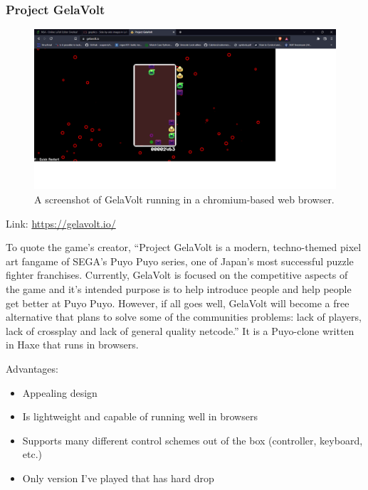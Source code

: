 \documentclass{report}
\begin{document}
\subsubsection{Project GelaVolt}

\begin{figure}[ht]
\centering
\includegraphics[width=1\textwidth]{gelavolt.png}
\caption{\label{fig:gelavolt}A screenshot of GelaVolt running in a chromium-based web browser.}
\end{figure}
Link: \href{https://gelavolt.io/}{https://gelavolt.io/}

To quote the game’s creator, “Project GelaVolt is a modern, techno-themed pixel art fangame of SEGA's Puyo Puyo series, one of Japan's most successful puzzle fighter franchises. Currently, GelaVolt is focused on the competitive aspects of the game and it's intended purpose is to help introduce people and help people get better at Puyo Puyo. However, if all goes well, GelaVolt will become a free alternative that plans to solve some of the communities problems: lack of players, lack of crossplay and lack of general quality netcode.” It is a Puyo-clone written in Haxe that runs in browsers.
\vspace{0.3cm}

Advantages:

\begin{itemize}
    \renewcommand\labelitemi{--}
    \item Appealing design
    \item Is lightweight and capable of running well in browsers
    \item Supports many different control schemes out of the box (controller, keyboard, etc.)
    \item Only version I’ve played that has hard drop
\end{itemize}
\end{document}
